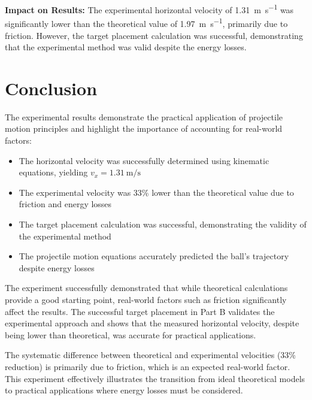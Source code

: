\documentclass[12pt]{article}
\begin{document}
\textbf{Impact on Results:}
The experimental horizontal velocity of \SI{1.31}{\meter\per\second} was significantly lower than the theoretical value of \SI{1.97}{\meter\per\second}, primarily due to friction. However, the target placement calculation was successful, demonstrating that the experimental method was valid despite the energy losses.

\section{Conclusion}

The experimental results demonstrate the practical application of projectile motion principles and highlight the importance of accounting for real-world factors:

\begin{itemize}
    \item The horizontal velocity was successfully determined using kinematic equations, yielding $v_x = \SI{1.31}{\meter\per\second}$
    \item The experimental velocity was 33\% lower than the theoretical value due to friction and energy losses
    \item The target placement calculation was successful, demonstrating the validity of the experimental method
    \item The projectile motion equations accurately predicted the ball's trajectory despite energy losses
\end{itemize}

The experiment successfully demonstrated that while theoretical calculations provide a good starting point, real-world factors such as friction significantly affect the results. The successful target placement in Part B validates the experimental approach and shows that the measured horizontal velocity, despite being lower than theoretical, was accurate for practical applications.

The systematic difference between theoretical and experimental velocities (33\% reduction) is primarily due to friction, which is an expected real-world factor. This experiment effectively illustrates the transition from ideal theoretical models to practical applications where energy losses must be considered.
\end{document}

